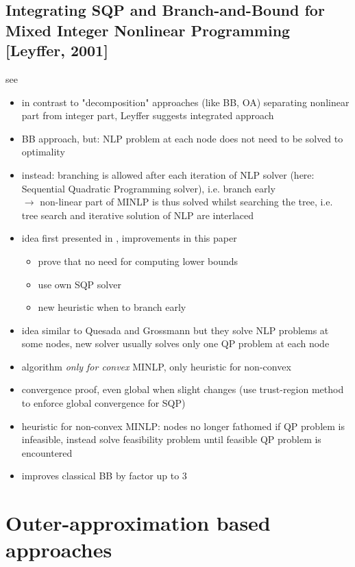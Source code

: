 \documentclass{article}
\begin{document}
\subsection{Integrating SQP and Branch-and-Bound for Mixed Integer Nonlinear Programming [Leyffer, 2001]}
see \cite{leyffer2001integrating}
\begin{itemize}
\item in contrast to "decomposition" approaches (like BB, OA) separating nonlinear part from integer part, Leyffer suggests integrated approach
\item BB approach, but: NLP problem at each node does not need to be solved to optimality
\item instead: branching is allowed after each iteration of NLP solver (here: Sequential Quadratic Programming solver), i.e. branch early\\
$\rightarrow$ non-linear part of MINLP is thus solved whilst searching the tree, i.e. tree search and iterative solution of NLP are interlaced
\item idea first presented in \cite{borchers1994improved}, improvements in this paper
	\begin{itemize}
	\item prove that no need for computing lower bounds
	\item use own SQP solver
	\item new heuristic when to branch early
	\end{itemize}
\item idea similar to Quesada and Grossmann \cite{quesada1992lp} but they solve NLP problems at some nodes, new solver usually solves only one QP problem at each node
\item algorithm \emph{only for convex} MINLP, only heuristic for non-convex
\item convergence proof, even global when slight changes (use trust-region method to enforce global convergence for SQP)
\item heuristic for non-convex MINLP: nodes no longer fathomed if QP problem is infeasible, instead solve feasibility problem until feasible QP problem is encountered
\item improves classical BB by factor up to 3
\end{itemize}

\newpage
\section{Outer-approximation based approaches}
\end{document}
